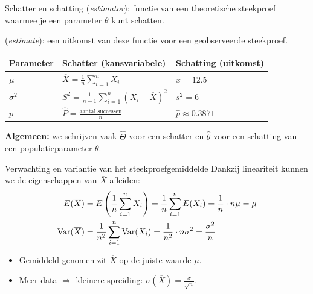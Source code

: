     \begin{frame}{Schatter en schatting}
         (\emph{estimator}): functie van een theoretische steekproef waarmee je een parameter $\theta$ kunt schatten.

         (\emph{estimate}): een uitkomst van deze functie voor een geobserveerde steekproef.
        \vfill
        \begin{center}
            \begin{tabular}{lll}
                \toprule
                    \textbf{Parameter} & \textbf{Schatter} (kansvariabele) & \textbf{Schatting} (uitkomst) \\
                \midrule
                    $\mu$      & $\overline{X} = \frac{1}{n}\sum_{i=1}^n X_i$ & $\overline{x} = 12.5$ \\
                    $\sigma^2$ & $S^2 = \frac{1}{n-1}\sum_{i=1}^n (X_i - \overline{X})^2$ & $s^2 = 6$ \\
                    $p$        & $\hat{P} = \frac{\text{aantal successen}}{n}$ & $\hat{p} \approx 0.3871$ \\
                \bottomrule
            \end{tabular}
        \end{center}
        \vfill
        \textbf{Algemeen:} we schrijven vaak $\hat{\Theta}$ voor een schatter en $\hat{\theta}$ voor een schatting van een populatieparameter $\theta$.
    \end{frame}

    \begin{frame}{Verwachting en variantie van het steekproefgemiddelde}
        Dankzij lineariteit kunnen we de eigenschappen van $\overline{X}$ afleiden:
        \begin{align*}
            E(\overline{X}) &= E\left(\frac{1}{n}\sum_{i=1}^n X_i\right) = \frac{1}{n}\sum_{i=1}^n E(X_i) = \frac{1}{n} \cdot n \mu = \mu \\
            \text{Var}(\overline{X}) &= \frac{1}{n^2}\sum_{i=1}^n \text{Var}(X_i) = \frac{1}{n^2} \cdot n\sigma^2 = \frac{\sigma^2}{n}
        \end{align*}
        \vfill
        \begin{itemize}
            \item Gemiddeld genomen zit $\overline{X}$ op de juiste waarde $\mu$.
            \item Meer data $\Rightarrow$ kleinere spreiding: $\sigma(\overline{X}) = \frac{\sigma}{\sqrt{n}}$.
        \end{itemize}
    \end{frame}

